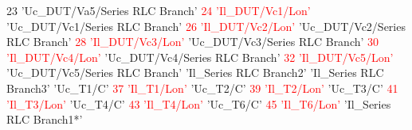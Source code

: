 \documentclass{article}
\begin{document}
    23  {       'Uc\_DUT/Va5/Series RLC Branch'}\newline
    \textcolor{red}{24  {       'Il\_DUT/Vc1/Lon'              }}  {       'Uc\_DUT/Vc1/Series RLC Branch'}\newline
    \textcolor{red}{26  {       'Il\_DUT/Vc2/Lon'              }}  {       'Uc\_DUT/Vc2/Series RLC Branch'}\newline
    \textcolor{red}{28  {       'Il\_DUT/Vc3/Lon'              }}  {       'Uc\_DUT/Vc3/Series RLC Branch'}\newline
    \textcolor{red}{30  {       'Il\_DUT/Vc4/Lon'              }}  {       'Uc\_DUT/Vc4/Series RLC Branch'}\newline
    \textcolor{red}{32  {       'Il\_DUT/Vc5/Lon'              }}  {       'Uc\_DUT/Vc5/Series RLC Branch'}  {       'Il\_Series RLC Branch2'       }  {       'Il\_Series RLC Branch3'       }  {       'Uc\_T1/C'                     }\newline
    \textcolor{red}{37  {       'Il\_T1/Lon'                   }}  {       'Uc\_T2/C'                     }\newline
    \textcolor{red}{39  {       'Il\_T2/Lon'                   }}  {       'Uc\_T3/C'                     }\newline
    \textcolor{red}{41  {       'Il\_T3/Lon'                   }}  {       'Uc\_T4/C'                     }\newline
    \textcolor{red}{43  {       'Il\_T4/Lon'                   }}  {       'Uc\_T6/C'                     }\newline
    \textcolor{red}{45  {       'Il\_T6/Lon'                   }}\newline
    {       'Il\_Series RLC Branch1*'      }\newline
\end{document}
